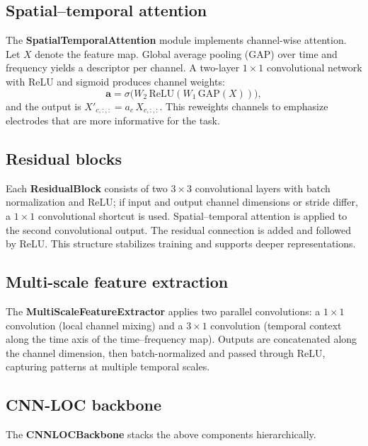 \documentclass[11pt,a4paper]{article}
\begin{document}
\subsection{Spatial--temporal attention}
\label{sec:attention}

The \textbf{SpatialTemporalAttention} module implements channel-wise attention. Let $X$ denote the feature map. Global average pooling (GAP) over time and frequency yields a descriptor per channel. A two-layer $1{\times}1$ convolutional network with ReLU and sigmoid produces channel weights:
\begin{equation}
  \mathbf{a} = \sigma\bigl(W_2\,\mathrm{ReLU}(W_1\,\mathrm{GAP}(X))\bigr),
\end{equation}
and the output is $X'_{c,:,:} = a_c\, X_{c,:,:}$. This reweights channels to emphasize electrodes that are more informative for the task.

\subsection{Residual blocks}
\label{sec:residual}

Each \textbf{ResidualBlock} consists of two $3{\times}3$ convolutional layers with batch normalization and ReLU; if input and output channel dimensions or stride differ, a $1{\times}1$ convolutional shortcut is used. Spatial--temporal attention is applied to the second convolutional output. The residual connection is added and followed by ReLU. This structure stabilizes training and supports deeper representations.

\subsection{Multi-scale feature extraction}
\label{sec:multiscale}

The \textbf{MultiScaleFeatureExtractor} applies two parallel convolutions: a $1{\times}1$ convolution (local channel mixing) and a $3{\times}1$ convolution (temporal context along the time axis of the time--frequency map). Outputs are concatenated along the channel dimension, then batch-normalized and passed through ReLU, capturing patterns at multiple temporal scales.

\subsection{CNN-LOC backbone}
\label{sec:backbone}

The \textbf{CNNLOCBackbone} stacks the above components hierarchically.
\end{document}
